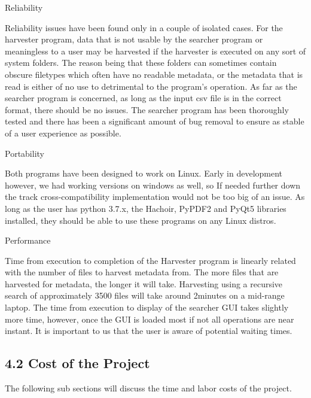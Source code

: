 \documentclass[11pt]{article}
\begin{document}
Reliability

Reliability issues have been found only in a couple of isolated cases. For the harvester program, data that is not usable by the searcher program or meaningless to a user may be harvested if the harvester is executed on any sort of system folders. The reason being that these folders can sometimes contain obscure filetypes which often have no readable metadata, or the metadata that is read is either of no use to detrimental to the program’s operation.
As far as the searcher program is concerned, as long as the input csv file is in the correct format, there should be no issues. The searcher program has been thoroughly tested and there has been a significant amount of bug removal to ensure as stable of a user experience as possible.

Portability

Both programs have been designed to work on Linux. Early in development however, we had working versions on windows as well, so If needed further down the track cross-compatibility implementation would not be too big of an issue. As long as the user has python 3.7.x, the Hachoir, PyPDF2 and PyQt5 libraries installed, they should be able to use these programs on any Linux distros.

Performance

Time from execution to completion of the Harvester program is linearly related with the number of files to harvest metadata from. The more files that are harvested for metadata, the longer it will take. Harvesting using a recursive search of approximately 3500 files will take around 2minutes on a mid-range laptop.
The time from execution to display of the searcher GUI takes slightly more time, however, once the GUI is loaded most if not all operations are near instant. It is important to us that the user is aware of potential waiting times.


\subsection{4.2 Cost of the Project}
The following sub sections will discuss the time and labor costs of the project.
\end{document}

